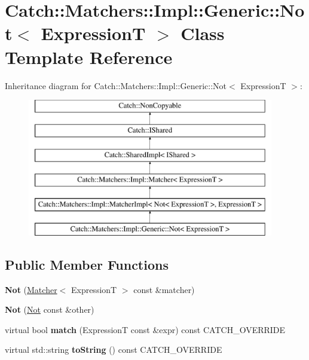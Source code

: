 \hypertarget{classCatch_1_1Matchers_1_1Impl_1_1Generic_1_1Not}{}\section{Catch\+:\+:Matchers\+:\+:Impl\+:\+:Generic\+:\+:Not$<$ ExpressionT $>$ Class Template Reference}
\label{classCatch_1_1Matchers_1_1Impl_1_1Generic_1_1Not}
Inheritance diagram for Catch\+:\+:Matchers\+:\+:Impl\+:\+:Generic\+:\+:Not$<$ ExpressionT $>$\+:\begin{figure}[H]
\begin{center}
\leavevmode
\includegraphics[height=6.000000cm]{classCatch_1_1Matchers_1_1Impl_1_1Generic_1_1Not}
\end{center}
\end{figure}
\subsection*{Public Member Functions}
\begin{DoxyCompactItemize}
\item 
\mbox{\label{classCatch_1_1Matchers_1_1Impl_1_1Generic_1_1Not_a9b99e3ce49c1a16931708b67c312f204}} 
{\bfseries Not} (\hyperlink{structCatch_1_1Matchers_1_1Impl_1_1Matcher}{Matcher}$<$ ExpressionT $>$ const \&matcher)
\item 
\mbox{\label{classCatch_1_1Matchers_1_1Impl_1_1Generic_1_1Not_a46eccbbaeec259d3536aa2a29f95208f}} 
{\bfseries Not} (\hyperlink{classCatch_1_1Matchers_1_1Impl_1_1Generic_1_1Not}{Not} const \&other)
\item 
\mbox{\label{classCatch_1_1Matchers_1_1Impl_1_1Generic_1_1Not_a18c49fc6fb73a42d54650dafc18c7db1}} 
virtual bool {\bfseries match} (ExpressionT const \&expr) const C\+A\+T\+C\+H\+\_\+\+O\+V\+E\+R\+R\+I\+DE
\item 
\mbox{\label{classCatch_1_1Matchers_1_1Impl_1_1Generic_1_1Not_ab970a4a6e58a987451e0b0e0e60a0bff}} 
virtual std\+::string {\bfseries to\+String} () const C\+A\+T\+C\+H\+\_\+\+O\+V\+E\+R\+R\+I\+DE
\end{DoxyCompactItemize}
